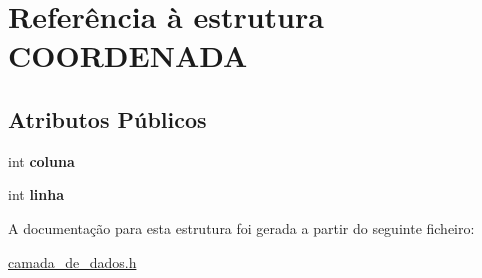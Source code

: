 \hypertarget{structCOORDENADA}{}\section{Referência à estrutura C\+O\+O\+R\+D\+E\+N\+A\+DA}
\label{structCOORDENADA}
\subsection*{Atributos Públicos}
\begin{DoxyCompactItemize}
\item 
\mbox{\label{structCOORDENADA_adfbc8d4856ce807139fdf62e00aed29a}} 
int {\bfseries coluna}
\item 
\mbox{\label{structCOORDENADA_aefe14bcc5a066ac3b21500cc3d28c06f}} 
int {\bfseries linha}
\end{DoxyCompactItemize}


A documentação para esta estrutura foi gerada a partir do seguinte ficheiro\+:\begin{DoxyCompactItemize}
\item 
\hyperlink{camada__de__dados_8h}{camada\+\_\+de\+\_\+dados.\+h}\end{DoxyCompactItemize}

